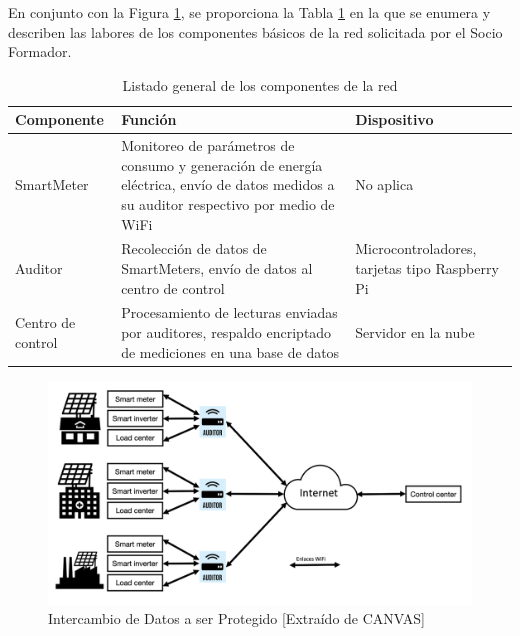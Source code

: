 \documentclass{article}
\begin{document}
            En conjunto con la Figura \ref{fig:dataExchange}, se proporciona la Tabla \ref{tab:component_basic} en la que se enumera y describen las labores de los componentes básicos de la red solicitada por el Socio Formador.
            \begin{table}[htbp]
                \centering
                \begin{tabularx}{\textwidth}{ |l|X|X| }
                    \hline
                    Componente & Función & Dispositivo \\
                    \hline
                    SmartMeter	& Monitoreo de parámetros de consumo y generación de energía eléctrica, envío de datos medidos a su auditor respectivo por medio de WiFi & No aplica \\
                    \hline
                    Auditor	& Recolección de datos de SmartMeters, envío de datos al centro de control & Microcontroladores, tarjetas tipo Raspberry Pi \\
                    \hline
                    Centro de control & Procesamiento de lecturas enviadas por auditores, respaldo encriptado de mediciones en una base de datos & Servidor en la nube \\
                    \hline
                \end{tabularx}
                \caption{Listado general de los componentes de la red}
                \label{tab:component_basic}
            \end{table}

            \begin{figure}[htbp]
                \centering
                \includegraphics[scale=0.30]{dataExchange.png}
                \caption{Intercambio de Datos a ser Protegido [Extraído de CANVAS]}
                \label{fig:dataExchange}
            \end{figure}
\end{document}
